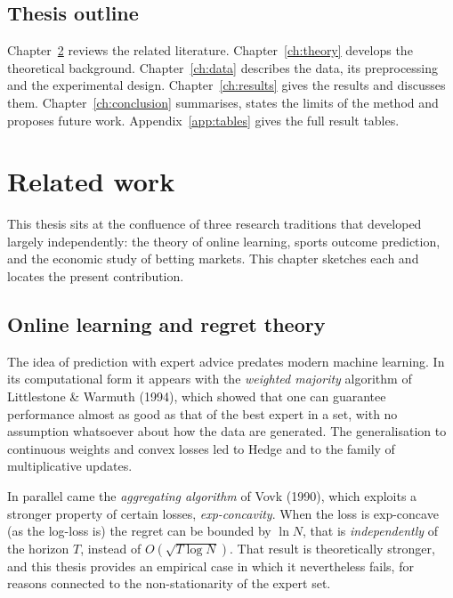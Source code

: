 \documentclass[12pt,a4paper,oneside]{report}
\renewcommand{\_}{\oldunderscore\allowbreak}
\theoremstyle{definition}
\theoremstyle{plain}
\theoremstyle{remark}
\begin{document}
\section{Thesis outline}

Chapter~\ref{ch:related} reviews the related literature. Chapter~\ref{ch:theory} develops the
theoretical background. Chapter~\ref{ch:data} describes the data, its preprocessing and the
experimental design. Chapter~\ref{ch:results} gives the results and discusses them.
Chapter~\ref{ch:conclusion} summarises, states the limits of the method and proposes future
work. Appendix~\ref{app:tables} gives the full result tables.

\chapter{Related work}
\label{ch:related}

This thesis sits at the confluence of three research traditions that developed largely
independently: the theory of online learning, sports outcome prediction, and the economic
study of betting markets. This chapter sketches each and locates the present contribution.

\section{Online learning and regret theory}

The idea of prediction with expert advice predates modern machine learning. In its
computational form it appears with the \emph{weighted majority} algorithm of Littlestone \&
Warmuth (1994), which showed that one can guarantee performance almost as good as that of the
best expert in a set, with no assumption whatsoever about how the data are generated. The
generalisation to continuous weights and convex losses led to Hedge and to the family of
multiplicative updates.

In parallel came the \emph{aggregating algorithm} of Vovk (1990), which exploits a stronger
property of certain losses, \emph{exp-concavity}. When the loss is exp-concave (as the log-loss
is) the regret can be bounded by $\ln N$, that is \emph{independently} of the horizon $T$,
instead of $O(\sqrt{T \log N})$. That result is theoretically stronger, and this thesis
provides an empirical case in which it nevertheless fails, for reasons connected to the
non-stationarity of the expert set.
\end{document}
